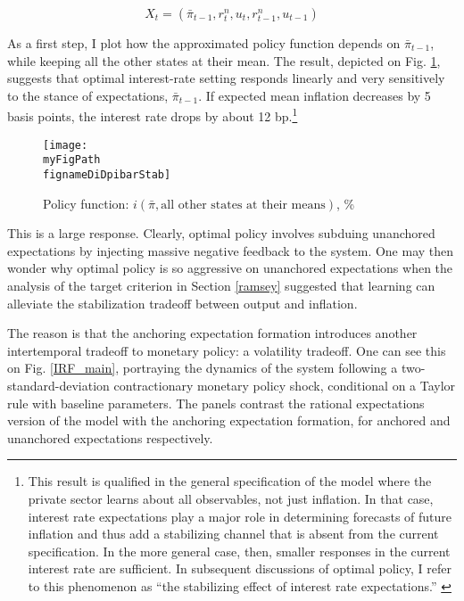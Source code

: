 \documentclass[11pt]{article}
\def \myFigPath {../../figures/}
\renewcommand{\[}{\begin{equation}}
\renewcommand{\]}{\end{equation}}
\def\movepibar{5 }
\def\movei{12 }
\def\fignameDiDpibar{analyze_opt_policy_ip17_Sep_2020}
\def\fignameDiDpibarStab{analyze_opt_policy_ip25_Sep_2020}
\begin{document}
\begin{equation}
X_t = (\bar{\pi}_{t-1}, r^n_t, u_t, r^n_{t-1}, u_{t-1})
\end{equation}

As a first step, I plot how the approximated policy function depends on $\bar{\pi}_{t-1}$, while keeping all the other states at their mean. The result, depicted on Fig. \ref{di}, suggests that optimal interest-rate setting responds linearly and very sensitively to the stance of expectations, $\bar{\pi}_{t-1}$. If expected mean inflation decreases by \movepibar basis points, the interest rate drops by about \movei bp.\footnote{This result is qualified in the general specification of the model where the private sector learns about all observables, not just inflation. In that case, interest rate expectations play a major role in determining forecasts of future inflation and thus add a stabilizing channel that is absent from the current specification. In the more general case, then, smaller responses in the current interest rate are sufficient. In subsequent discussions of optimal policy, I refer to this phenomenon as ``the stabilizing effect of interest rate expectations.'' \label{footnote_why_nonstationary}} 

\begin{figure}[h!]
\texttt{[image: \\myFigPath \\fignameDiDpibarStab]}
\caption{Policy function: $i(\bar{\pi}, \text{all other states at their means})$, \%}
\label{di}
\end{figure}

This is a large response. Clearly, optimal policy involves subduing unanchored expectations by injecting massive negative feedback to the system. One may then wonder why optimal policy is so aggressive on unanchored expectations when the analysis of the target criterion in Section \ref{ramsey} suggested that learning can alleviate the stabilization tradeoff between output and inflation. 

The reason is that the anchoring expectation formation introduces another intertemporal tradeoff to monetary policy: a volatility tradeoff. One can see this on Fig. \ref{IRF_main}, portraying the dynamics of the system following a two-standard-deviation contractionary monetary policy shock, conditional on a Taylor rule with baseline parameters. The panels contrast the rational expectations version of the model with the anchoring expectation formation, for anchored and unanchored expectations respectively. 
\end{document}
